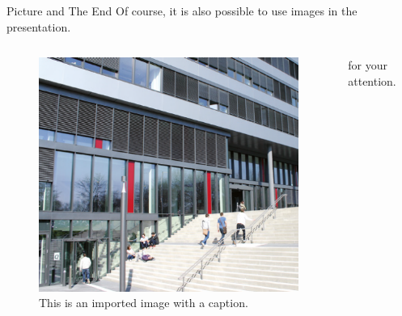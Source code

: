 \documentclass[
	] {beamer}
\begin{document}
\smallframetitle
\begin{frame}{Picture and The End}
	Of course, it is also possible to use images in the presentation.

	\vfill

	\begin{columns}
		\begin{column}{.5\linewidth}
			\begin{figure}
				\includegraphics[width=.7\linewidth]{abb/upbBackground.png}
				\caption{This is an imported image with a caption.}
				\label{abb:image}
			\end{figure}
		\end{column}
		\begin{column}{.5\linewidth}
			\LARGE \centering
			 for your attention.
		\end{column}
	\end{columns}
\end{frame}
\end{document}
